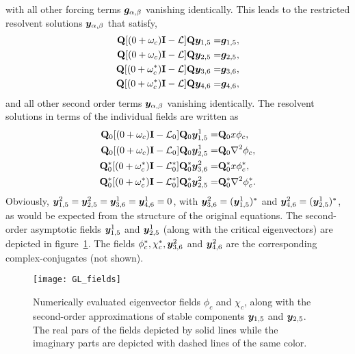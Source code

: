 with all other forcing terms $\boldsymbol{g}_{\alpha,\beta}$ vanishing identically. This leads to the restricted resolvent solutions $\boldsymbol{y}_{\alpha,\beta}$ that satisfy,
 \begin{subequations}
 	\label{eqn:GL_resolvents}
	 \begin{align}
	 	\mathbf{Q}[(0 + \omega_{c})\mathbf{I} - \mathcal{L}]\mathbf{Q}\boldsymbol{y}_{1,5} =& \boldsymbol{g}_{1,5}, \\
	 	\mathbf{Q}[(0 + \omega_{c})\mathbf{I} - \mathcal{L}]\mathbf{Q}\boldsymbol{y}_{2,5} =& \boldsymbol{g}_{2,5}, \\
	 	\mathbf{Q}[(0 + \omega^{*}_{c})\mathbf{I} - \mathcal{L}]\mathbf{Q}\boldsymbol{y}_{3,6} =& \boldsymbol{g}_{3,6}, \\
	 	\mathbf{Q}[(0 + \omega^{*}_{c})\mathbf{I} - \mathcal{L}]\mathbf{Q}\boldsymbol{y}_{4,6} =& \boldsymbol{g}_{4,6}, 
	 \end{align}
\end{subequations}
and all other second order terms $\boldsymbol{y}_{\alpha,\beta}$ vanishing identically. The resolvent solutions in terms of the individual fields are written as
 \begin{subequations}
 	\label{eqn:GL_sub_resolvents}
	 \begin{align}
	 	\mathbf{Q}_{0}[(0 + \omega_{c})\mathbf{I} - \mathcal{L}_{0}]\mathbf{Q}_{0}\boldsymbol{y}^{1}_{1,5} =& \mathbf{Q}_{0}x\phi_{c}, \\
	 	\mathbf{Q}_{0}[(0 + \omega_{c})\mathbf{I} - \mathcal{L}_{0}]\mathbf{Q}_{0}\boldsymbol{y}^{1}_{2,5} =& \mathbf{Q}_{0}\nabla^{2}\phi_{c}, \\
	 	\mathbf{Q}^{*}_{0}[(0 + \omega^{*}_{c})\mathbf{I} - \mathcal{L}^{*}_{0}]\mathbf{Q}^{*}_{0}\boldsymbol{y}^{2}_{3,6} =& \mathbf{Q}^{*}_{0}x\phi^{*}_{c}, \\
		\mathbf{Q}^{*}_{0}[(0 + \omega^{*}_{c})\mathbf{I} - \mathcal{L}^{*}_{0}]\mathbf{Q}^{*}_{0}\boldsymbol{y}^{2}_{2,5} =& \mathbf{Q}^{*}_{0}\nabla^{2}\phi^{*}_{c}.
	 \end{align}
\end{subequations}
 Obviously, $\boldsymbol{y}^{2}_{1,5} = \boldsymbol{y}^{2}_{2,5} = \boldsymbol{y}^{1}_{3,6} = \boldsymbol{y}^{1}_{4,6} = 0$, with
 $\boldsymbol{y}^{2}_{3,6} = (\boldsymbol{y}^{1}_{1,5})^{*}$ and $\boldsymbol{y}^{2}_{4,6} = (\boldsymbol{y}^{1}_{2,5})^{*}$, as would be expected from the structure of the original equations. The second-order asymptotic fields $\boldsymbol{y}^{1}_{1,5}$ and $\boldsymbol{y}^{1}_{2,5}$ (along with the critical eigenvectors) are depicted in figure~\ref{fig:GL_fields}. The fields $\phi^{*}_{c}, \chi^{*}_{c},\boldsymbol{y}^{2}_{3,6}$ and $\boldsymbol{y}^{2}_{4,6}$ are the corresponding complex-conjugates (not shown). 
\begin{figure}
	\centering
	\texttt{[image: GL\_fields]}
	\caption{Numerically evaluated eigenvector fields $\phi_{c}$ and $\chi_{c}$, along with the second-order approximations of stable components $\boldsymbol{y}_{1,5}$ and $\boldsymbol{y}_{2,5}$. The real pars of the fields depicted by solid lines while the imaginary parts are depicted with dashed lines of the same color.}
	\label{fig:GL_fields}
\end{figure} 

